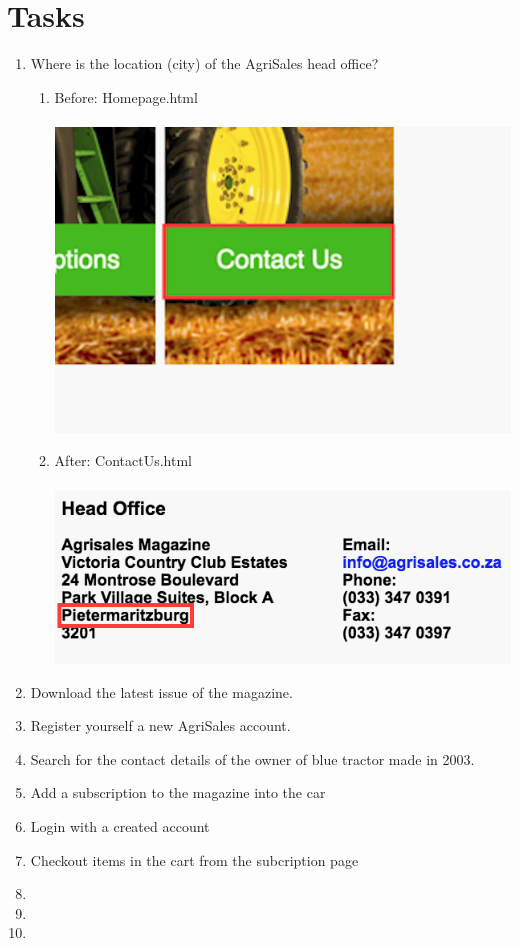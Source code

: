 \documentclass[11pt]{article}
\begin{document}
\section{Tasks}
	\begin{enumerate}
		\item Where is the location (city) of the AgriSales head office?
				\begin{enumerate}
					\item Before: Homepage.html \\ \\
						\includegraphics[width=0.5\linewidth]{../Images/Tasks/Task1Before}
					\item After: ContactUs.html \\ \\
						\includegraphics[width=0.5\linewidth]{../Images/Tasks/Task1After}
				\end{enumerate}
		\item Download the latest issue of the magazine.
		\item Register yourself a new AgriSales account.
		\item Search for the contact details of the owner of blue tractor made in 2003.
		\item Add a subscription to the magazine into the car
		\item Login with a created account
		\item Checkout items in the cart from the subcription page
		\item 
		\item 
		\item 
	\end{enumerate}
\end{document}
